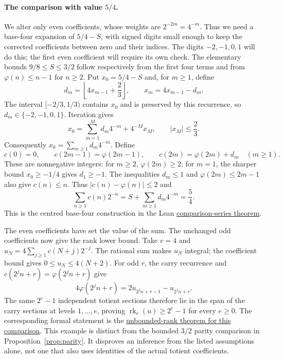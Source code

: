 \documentclass[11pt]{article}
\theoremstyle{plain}
\theoremstyle{definition}
\theoremstyle{remark}
\newcommand{\ph}{\varphi}
\begin{document}
\paragraph{The comparison with value $5/4$.}
We alter only even coefficients, whose weights are
$2^{-2m}=4^{-m}$. Thus we need a base-four expansion of $5/4-S$,
with signed digits small enough to keep the corrected coefficients
between zero and their indices. The digits $-2,-1,0,1$ will do this;
the first even coefficient will require its own check.
The elementary bounds $9/8\le S\le3/2$ follow respectively from the
first four terms and from $\ph(n)\le n-1$ for $n\ge2$.
Put $x_0=5/4-S$ and, for $m\ge1$, define
\[
 d_m=\left\lfloor4x_{m-1}+\frac23\right\rfloor,
 \qquad x_m=4x_{m-1}-d_m.
\]
The interval $[-2/3,1/3)$ contains $x_0$ and is preserved by this
recurrence, so $d_m\in\{-2,-1,0,1\}$. Iteration gives
\[
 x_0=\sum_{m=1}^{M}d_m4^{-m}+4^{-M}x_M,
 \qquad |x_M|\le\frac23.
\]
Consequently $x_0=\sum_{m\ge1}d_m4^{-m}$. Define
\[
 c(0)=0,\qquad c(2m-1)=\ph(2m-1),\qquad
 c(2m)=\ph(2m)+d_m\quad(m\ge1).
\]
These are nonnegative integers: for $m\ge2$, $\ph(2m)\ge2$;
for $m=1$, the sharper bound $x_0\ge-1/4$ gives $d_1\ge-1$.
The inequalities $d_m\le1$ and $\ph(2m)\le2m-1$ also give $c(n)\le n$.
Thus $|c(n)-\ph(n)|\le2$ and
\[
 \sum_{n\ge1}c(n)2^{-n}=S+\sum_{m\ge1}d_m4^{-m}=\frac54.
\]
This is the centred base-four construction in the Lean
\href{https://github.com/wcook04/plectis-erdos-lean/blob/52f29ad173b04e3bac941b3663f2b9aebe5de0bb/ErdosProblems/Erdos249/ParityPerturbedRationalControl.lean#L379}{comparison-series theorem}.

The even coefficients have set the value of the sum. The unchanged
odd coefficients now give the rank lower bound. Take $v=4$ and
$u_N=4\sum_{j\ge1}c(N+j)2^{-j}$. The rational sum makes $u_N$ integral;
the coefficient bound gives $0\le u_N\le4(N+2)$. For odd $r$, the
carry recurrence and $c(2^jn+r)=\ph(2^jn+r)$ give
\[
 4\ph(2^j n+r)=2u_{2^j n+r-1}-u_{2^j n+r}.
\]
The same $2^e-1$ independent totient sections therefore lie in the
span of the carry sections at levels $1,\ldots,e$, proving
$\operatorname{rk}_e(u)\ge2^e-1$ for every $e\ge0$.
The corresponding formal statement is the
\href{https://github.com/wcook04/plectis-erdos-lean/blob/52f29ad173b04e3bac941b3663f2b9aebe5de0bb/ErdosProblems/Erdos249/ParityPerturbedRationalControl.lean#L478}{unbounded-rank theorem for this comparison}.
This example is distinct from the bounded $3/2$ parity comparison in
Proposition~\ref{prop:parity}. It disproves an inference from the listed
assumptions alone, not one that also uses identities of the actual
totient coefficients.
\end{document}
